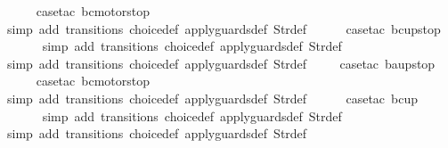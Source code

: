 \begin{isabellebody}
\ \ \ \ \isamarkupfalse%
\ {\isacharparenleft}case{\isacharunderscore}tac\ {\isachardoublequoteopen}bc{\isacharequal}motorstop\ {}{\isachardoublequoteclose}{\isacharparenright}\isanewline
\ \ \ \ \ \isamarkupfalse%
\ {\isacharparenleft}simp\ add{\isacharcolon}\ transitions\ choice{\isacharunderscore}def\ apply{\isacharunderscore}guards{\isacharunderscore}def\ Str{\isacharunderscore}def{\isacharparenright}\isanewline
\ \ \ \ \isamarkupfalse%
\ {\isacharparenleft}case{\isacharunderscore}tac\ {\isachardoublequoteopen}bc{\isacharequal}up{}{}stop{\isachardoublequoteclose}{\isacharparenright}\isanewline
\ \ \ \ \ \isamarkupfalse%
\ {\isacharparenleft}simp\ add{\isacharcolon}\ transitions\ choice{\isacharunderscore}def\ apply{\isacharunderscore}guards{\isacharunderscore}def\ Str{\isacharunderscore}def{\isacharparenright}\isanewline
\ \ \ \ \ \isamarkupfalse%
\ {\isacharparenleft}simp\ add{\isacharcolon}\ transitions\ choice{\isacharunderscore}def\ apply{\isacharunderscore}guards{\isacharunderscore}def\ Str{\isacharunderscore}def{\isacharparenright}\isanewline
\ \ \ \isamarkupfalse%
\ {\isacharparenleft}case{\isacharunderscore}tac\ {\isachardoublequoteopen}ba{\isacharequal}up{}{}stop{\isachardoublequoteclose}{\isacharparenright}\isanewline
\ \ \ \ \isamarkupfalse%
\ {\isacharparenleft}case{\isacharunderscore}tac\ {\isachardoublequoteopen}bc{\isacharequal}motorstop\ {}{\isachardoublequoteclose}{\isacharparenright}\isanewline
\ \ \ \ \ \isamarkupfalse%
\ {\isacharparenleft}simp\ add{\isacharcolon}\ transitions\ choice{\isacharunderscore}def\ apply{\isacharunderscore}guards{\isacharunderscore}def\ Str{\isacharunderscore}def{\isacharparenright}\isanewline
\ \ \ \ \isamarkupfalse%
\ {\isacharparenleft}case{\isacharunderscore}tac\ {\isachardoublequoteopen}bc{\isacharequal}up{}{}{\isachardoublequoteclose}{\isacharparenright}\isanewline
\ \ \ \ \ \isamarkupfalse%
\ {\isacharparenleft}simp\ add{\isacharcolon}\ transitions\ choice{\isacharunderscore}def\ apply{\isacharunderscore}guards{\isacharunderscore}def\ Str{\isacharunderscore}def{\isacharparenright}\isanewline
\ \ \ \ \isamarkupfalse%
\ {\isacharparenleft}simp\ add{\isacharcolon}\ transitions\ choice{\isacharunderscore}def\ apply{\isacharunderscore}guards{\isacharunderscore}def\ Str{\isacharunderscore}def{\isacharparenright}\isanewline

\end{isabellebody}
